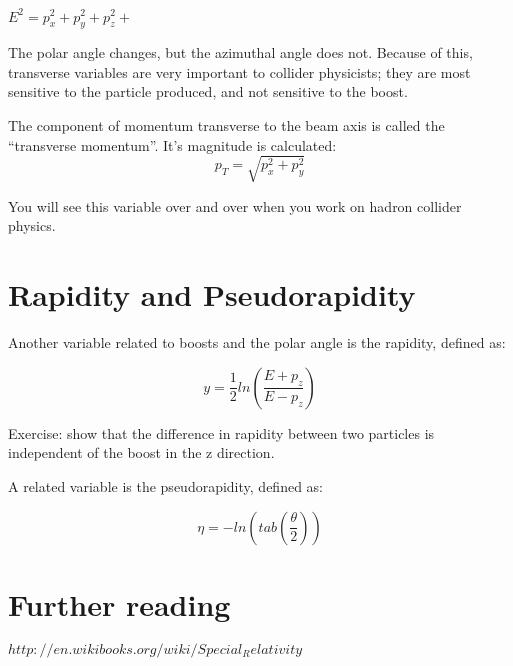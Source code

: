 	$E^2 = p_x^2 + p_y^2 + p_z^2 +$  

The polar angle changes, but the azimuthal angle does not.  Because of this, transverse variables are very important to collider physicists; they are most sensitive to the particle produced, and not sensitive to the boost.

The component of momentum transverse to the beam axis is called the “transverse momentum”.  It’s magnitude is calculated:
\begin{equation}
	 p_T =   \sqrt{p_x^2 +p_y^2}
\end{equation} 
  

You will see this variable over and over when you work on hadron collider physics.

\section{Rapidity and Pseudorapidity}

Another variable related to boosts and the polar angle is the rapidity, defined as:

\begin{equation}
	 y =  \frac{1}{2} ln (\frac{E + p_z}{E-p_z})
\end{equation} 
	  

Exercise: show that the difference in rapidity between two particles is independent of the boost in the z direction.

A related variable is the pseudorapidity, defined as:

\begin{equation}
	 \eta  = - ln (tab (\frac{\theta}{2}))
\end{equation} 



\section{Further reading}
	
$http://en.wikibooks.org/wiki/Special_Relativity$


